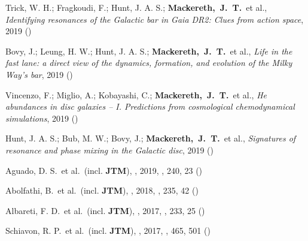 \item[{\scriptsize8}]Trick, W. H.; Fragkoudi, F.; Hunt, J. A. S.; \textbf{Mackereth,~J.~T.}~et al., \textit{Identifying resonances of the Galactic bar in Gaia DR2: Clues from action space}, 2019 ()

\item[{\scriptsize7}]Bovy, J.; Leung, H. W.; Hunt, J. A. S.; \textbf{Mackereth,~J.~T.}~et al., \textit{Life in the fast lane: a direct view of the dynamics, formation, and evolution of the Milky Way's bar}, 2019 ()

\item[{\scriptsize6}]Vincenzo, F.; Miglio, A.; Kobayashi, C.; \textbf{Mackereth,~J.~T.}~et al., \textit{He abundances in disc galaxies -- I. Predictions from cosmological chemodynamical simulations}, 2019 ()

\item[{\scriptsize5}]Hunt, J. A. S.; Bub, M. W.; Bovy, J.; \textbf{Mackereth,~J.~T.}~et al., \textit{Signatures of resonance and phase mixing in the Galactic disc}, 2019 ()

\item[{\scriptsize4}]Aguado, D. S.~et al.~(incl. \textbf{JTM}), , 2019, \apjs, {240}, 23 ()

\item[{\scriptsize3}]Abolfathi, B.~et al.~(incl. \textbf{JTM}), , 2018, \apjs, {235}, 42 ()

\item[{\scriptsize2}]Albareti, F. D.~et al.~(incl. \textbf{JTM}), , 2017, \apjs, {233}, 25 ()

\item[{\scriptsize1}]Schiavon, R. P.~et al.~(incl. \textbf{JTM}), , 2017, \mnras, {465}, 501 ()